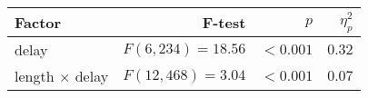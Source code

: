 
\setlength{\tabcolsep}{0pt} %
\begin{tabular*}{\columnwidth}{@{\extracolsep{\fill}\quad}lrrr@{}}
\textbf{Factor} & \textbf{F-test} & \textbf{\(p\)} & \textbf{\(\eta^{2}_{p}\)} \\ \toprule
delay & \(F(6, 234) = 18.56\) & \(<0.001\) & \(0.32\) \\
length \(\times\) delay & \(F(12, 468) = 3.04\) & \(<0.001\) & \(0.07\) \\ \bottomrule
\end{tabular*}%